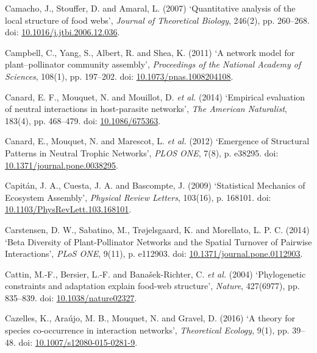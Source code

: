 \documentclass[12pt]{article}
\begin{document}
\hypertarget{ref-cama07qal}{}
Camacho, J., Stouffer, D. and Amaral, L. (2007) `Quantitative analysis
of the local structure of food webs', \emph{Journal of Theoretical
Biology}, 246(2), pp. 260--268. doi:
\href{https://doi.org/10.1016/j.jtbi.2006.12.036}{10.1016/j.jtbi.2006.12.036}.

\hypertarget{ref-camp11nmp}{}
Campbell, C., Yang, S., Albert, R. and Shea, K. (2011) `A network model
for plant--pollinator community assembly', \emph{Proceedings of the
National Academy of Sciences}, 108(1), pp. 197--202. doi:
\href{https://doi.org/10.1073/pnas.1008204108}{10.1073/pnas.1008204108}.

\hypertarget{ref-cana14een}{}
Canard, E. F., Mouquet, N. and Mouillot, D. \emph{et al.} (2014)
`Empirical evaluation of neutral interactions in host-parasite
networks', \emph{The American Naturalist}, 183(4), pp. 468--479. doi:
\href{https://doi.org/10.1086/675363}{10.1086/675363}.

\hypertarget{ref-cana12esp}{}
Canard, E., Mouquet, N. and Marescot, L. \emph{et al.} (2012) `Emergence
of Structural Patterns in Neutral Trophic Networks', \emph{PLOS ONE},
7(8), p. e38295. doi:
\href{https://doi.org/10.1371/journal.pone.0038295}{10.1371/journal.pone.0038295}.

\hypertarget{ref-capi09sme}{}
Capitán, J. A., Cuesta, J. A. and Bascompte, J. (2009) `Statistical
Mechanics of Ecosystem Assembly', \emph{Physical Review Letters},
103(16), p. 168101. doi:
\href{https://doi.org/10.1103/PhysRevLett.103.168101}{10.1103/PhysRevLett.103.168101}.

\hypertarget{ref-cars14bdp}{}
Carstensen, D. W., Sabatino, M., Trøjelsgaard, K. and Morellato, L. P.
C. (2014) `Beta Diversity of Plant-Pollinator Networks and the Spatial
Turnover of Pairwise Interactions', \emph{PLoS ONE}, 9(11), p. e112903.
doi:
\href{https://doi.org/10.1371/journal.pone.0112903}{10.1371/journal.pone.0112903}.

\hypertarget{ref-catt04pca}{}
Cattin, M.-F., Bersier, L.-F. and Banašek-Richter, C. \emph{et al.}
(2004) `Phylogenetic constraints and adaptation explain food-web
structure', \emph{Nature}, 427(6977), pp. 835--839. doi:
\href{https://doi.org/10.1038/nature02327}{10.1038/nature02327}.

\hypertarget{ref-caze16tsc}{}
Cazelles, K., Araújo, M. B., Mouquet, N. and Gravel, D. (2016) `A theory
for species co-occurrence in interaction networks', \emph{Theoretical
Ecology}, 9(1), pp. 39--48. doi:
\href{https://doi.org/10.1007/s12080-015-0281-9}{10.1007/s12080-015-0281-9}.
\end{document}
